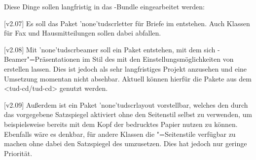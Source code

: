
Diese Dinge sollen langfristig in das \TUDScript-Bundle eingearbeitet werden:

[v2.07]
Es soll das Paket \Package*'none'{tudscrletter} für Briefe im \TUDCD entstehen. 
Auch Klassen für Fax und Hausmitteilungen sollen dabei abfallen.

[v2.08]
Mit \Package*'none'{tudscrbeamer} soll ein Paket entstehen, mit dem sich
-Beamer"=Präsentationen im Stil des \TUDCDs mit den 
Einstellungsmöglichkeiten von \TUDScript erstellen lassen. Dies ist jedoch als 
sehr langfristiges Projekt anzusehen und eine Umsetzung momentan nicht 
absehbar. Aktuell können hierfür die Pakete aus dem \GitHubRepo<tud-cd/tud-cd> 
genutzt werden.

[v2.09]
Außerdem ist ein Paket \Package*'none'{tudscrlayout} vorstellbar, welches den 
durch das \CD vorgegebene Satzspiegel aktiviert ohne den Seitenstil selbst zu 
verwenden, um beispielsweise bereits mit dem Kopf der \TnUD bedrucktes Papier 
nutzen zu können. Ebenfalls wäre es denkbar, für andere Klassen die 
"=Seitenstile verfügbar zu machen ohne dabei den 
Satzspiegel des \CDs umzusetzen. Dies hat jedoch nur geringe Priorität.
